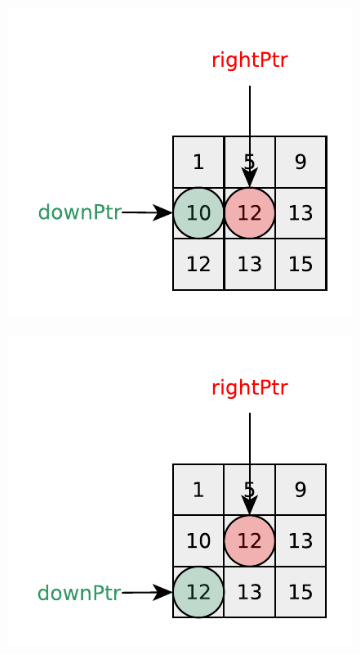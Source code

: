 \begin{figure}
\begin{subfigure}[t]{0.32\textwidth}
        \caption{}
        \label{fig:kth_smallest_in_sorted_matrix:visit2}
     \end{subfigure}
     \hfill
    \begin{subfigure}[t]{0.32\textwidth}
        \includegraphics[width=1\linewidth]{sources/kth_smallest_in_sorted_matrix/images/visit3}
        \caption{}
        \label{fig:kth_smallest_in_sorted_matrix:visit3}
     \end{subfigure}
     \hfill
    \begin{subfigure}[t]{0.32\textwidth}
        \includegraphics[width=1\linewidth]{sources/kth_smallest_in_sorted_matrix/images/visit4}

\end{subfigure}
\end{figure}
